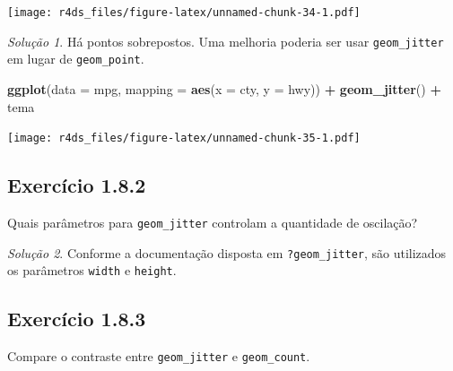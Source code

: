 \documentclass[
]{latex/krantz}
\newenvironment{Shaded}{\begin{snugshade}}{\end{snugshade}}
\newcommand{\AttributeTok}[1]{\textcolor[rgb]{0.13,0.29,0.53}{#1}}
\newcommand{\FunctionTok}[1]{\textcolor[rgb]{0.13,0.29,0.53}{\textbf{#1}}}
\newcommand{\NormalTok}[1]{#1}
\newcommand{\SpecialCharTok}[1]{\textcolor[rgb]{0.81,0.36,0.00}{\textbf{#1}}}
\theoremstyle{definition}
\theoremstyle{definition}
\theoremstyle{definition}
\theoremstyle{definition}
\theoremstyle{remark}
\newtheorem*{solution}{Solução}
\begin{document}
\texttt{[image: r4ds\_files/figure-latex/unnamed-chunk-34-1.pdf]}

\begin{solution}
Há pontos sobrepostos. Uma melhoria poderia ser usar \texttt{geom\_jitter} em lugar de \texttt{geom\_point}.

\begin{Shaded}
\begin{Highlighting}[]
\FunctionTok{ggplot}\NormalTok{(}\AttributeTok{data =}\NormalTok{ mpg, }\AttributeTok{mapping =} \FunctionTok{aes}\NormalTok{(}\AttributeTok{x =}\NormalTok{ cty, }\AttributeTok{y =}\NormalTok{ hwy)) }\SpecialCharTok{+}
    \FunctionTok{geom\_jitter}\NormalTok{() }\SpecialCharTok{+}
\NormalTok{    tema}
\end{Highlighting}
\end{Shaded}

\texttt{[image: r4ds\_files/figure-latex/unnamed-chunk-35-1.pdf]}
\end{solution}

\hypertarget{exr1-8-2}{%
\subsection*{Exercício 1.8.2}\label{exr1-8-2}}

Quais parâmetros para \texttt{geom\_jitter} controlam a quantidade de oscilação?

\begin{solution}
Conforme a documentação disposta em \texttt{?geom\_jitter}, são utilizados os parâmetros \texttt{width} e \texttt{height}.
\end{solution}

\hypertarget{exr1-8-3}{%
\subsection*{Exercício 1.8.3}\label{exr1-8-3}}

Compare o contraste entre \texttt{geom\_jitter} e \texttt{geom\_count}.
\end{document}
